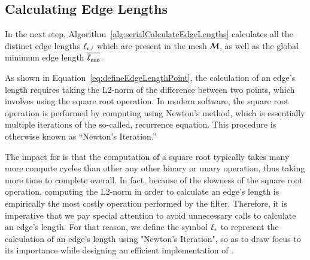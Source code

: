 %
%
\subsection{Calculating Edge Lengths}
\label{ch5sSIssCEL}
In the next step, Algorithm~\ref{alg:serialCalculateEdgeLengths} calculates all the distinct edge lengths $\ell_{v,\kern.75pt i}$ which are present in the mesh $\mathcal{M}$, as well as the global minimum edge length $\overline{\ell_\text{min}}$.

As shown in Equation~\ref{eq:defineEdgeLengthPoint}, the calculation of an edge's length requires taking the L2-norm of the difference between two points, which involves using the square root operation. In modern software, the square root operation is performed by computing using Newton's method, which is essentially multiple iterations of the so-called, recurrence equation. This procedure is otherwise known as ``Newton's Iteration.'' ~\cite{Weisstein19b}

The impact for  is that the computation of a square root typically takes many more compute cycles than other any other binary or unary operation, thus taking more time to complete overall. In fact, because of the slowness of the square root operation, computing the L2-norm in order to calculate an edge's length is empirically the most costly operation performed by the filter. Therefore, it is imperative that we pay special attention to avoid unnecessary calls to calculate an edge's length. For that reason, we define the symbol $\ell_\ast$ to represent the calculation of an edge's length using "Newton's Iteration", so as to draw focus to its importance while designing an efficient implementation of .


